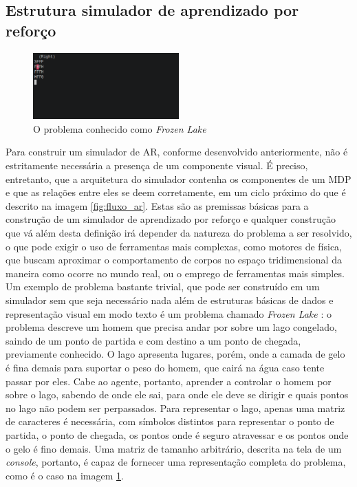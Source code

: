 \documentclass[cic,tc]{iiufrgs}
\begin{document}
\subsection{Estrutura simulador de aprendizado por reforço}


\begin{figure}[h]
    \caption{O problema conhecido como \textit{Frozen Lake}}
    \begin{center}
      \includegraphics[width=0.5\textwidth]{frozen_lake.png}
    \end{center}
    \label{fig:frozen_lake}
\end{figure}


Para construir um simulador de AR, conforme desenvolvido anteriormente, não é
estritamente necessária a presença de um componente visual. É preciso,
entretanto, que a arquitetura do simulador contenha os componentes de um MDP e
que as relações entre eles se deem corretamente, em um ciclo próximo do que é
descrito na imagem \ref{fig:fluxo_ar}. Estas são as premissas básicas para a
construção de um simulador de aprendizado por reforço e qualquer construção que
vá além desta definição irá depender da natureza do problema a ser resolvido, o
que pode exigir o uso de ferramentas mais complexas, como motores de física, que
buscam aproximar o comportamento de corpos no espaço tridimensional da maneira
como ocorre no mundo real, ou o emprego de ferramentas mais simples. Um exemplo
de problema bastante trivial, que pode ser construído em um simulador sem que
seja necessário nada além de estruturas básicas de dados e representação visual
em modo texto é um problema chamado \textit{Frozen Lake} \cite{FrozenLake}: o problema descreve
um homem que precisa andar por sobre um lago congelado, saindo de um ponto de
partida e com destino a um ponto de chegada, previamente conhecido. O lago
apresenta lugares,
porém, onde a camada de gelo é fina demais para suportar o peso do homem, que
cairá na água caso tente passar por eles. Cabe ao agente, portanto, aprender a
controlar o homem por sobre o lago, sabendo de onde ele sai, para onde ele deve
se dirigir e quais pontos no lago não podem ser perpassados. Para representar o
lago, apenas uma matriz de caracteres é necessária, com símbolos distintos para
representar o ponto de partida, o ponto de chegada, os pontos onde é seguro
atravessar e os pontos onde o gelo é fino demais. Uma matriz de tamanho
arbitrário, descrita na tela de um \textit{console}, portanto, é capaz de
fornecer uma representação completa do problema, como é o caso na imagem
\ref{fig:frozen_lake}.
\end{document}
